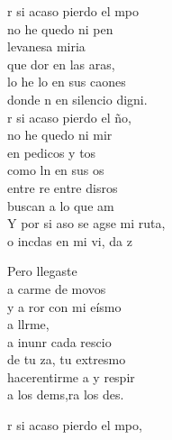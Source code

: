 \begin{cancion}%
	r si acaso pierdo el mpo \\
	no he quedo ni pen \\
	levanesa miria \\
	que dor en las aras, \\
	lo he lo en sus caones \\
	donde n en silencio digni. \\
	\jump
	r si acaso pierdo el ño, \\
	no he quedo ni mir \\
	en pedicos y tos\\
	como ln en sus os \\
	entre re entre disros\\
	buscan  a lo que am \\
	\jump
	Y por si aso se agse mi ruta,\\
	o incdas en mi vi, da z \jump\\
	\begin{chorus}%
		Pero llegaste  \\
		a carme de movos\\
		y a ror con mi eísmo\\
		a llrme, \\
		a inunr cada rescio\\
		de tu za, tu extresmo \\
		hacerentirme a y respir \\
		a los dems,ra los des.\jump\\
	\end{chorus}%
	r si acaso pierdo el mpo, \\

\end{cancion}
